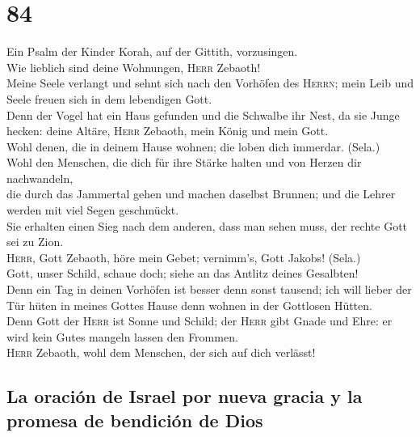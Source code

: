 \hypertarget{section-83}{%
\section{84}\label{section-83}}

 Ein Psalm der Kinder Korah, auf der Gittith,
vorzusingen.\\
 Wie lieblich sind deine Wohnungen, \textsc{Herr}
Zebaoth!\\
 Meine Seele verlangt und sehnt sich nach den Vorhöfen des
\textsc{Herrn}; mein Leib und Seele freuen sich in dem lebendigen
Gott.\\
 Denn der Vogel hat ein Haus gefunden und die Schwalbe ihr
Nest, da sie Junge hecken: deine Altäre, \textsc{Herr} Zebaoth, mein
König und mein Gott.\\
 Wohl denen, die in deinem Hause wohnen; die loben dich
immerdar. (Sela.)\\
 Wohl den Menschen, die dich für ihre Stärke halten und
von Herzen dir nachwandeln,\\
 die durch das Jammertal gehen und machen daselbst
Brunnen; und die Lehrer werden mit viel Segen geschmückt.\\
 Sie erhalten einen Sieg nach dem anderen, dass man sehen
muss, der rechte Gott sei zu Zion.\\
 \textsc{Herr}, Gott Zebaoth, höre mein Gebet; vernimm's,
Gott Jakobs! (Sela.)\\
 Gott, unser Schild, schaue doch; siehe an das Antlitz
deines Gesalbten!\\
 Denn ein Tag in deinen Vorhöfen ist besser denn sonst
tausend; ich will lieber der Tür hüten in meines Gottes Hause denn
wohnen in der Gottlosen Hütten.\\
 Denn Gott der \textsc{Herr} ist Sonne und Schild; der
\textsc{Herr} gibt Gnade und Ehre: er wird kein Gutes mangeln lassen den
Frommen.\\
 \textsc{Herr} Zebaoth, wohl dem Menschen, der sich auf
dich verlässt!

\hypertarget{la-oraciuxf3n-de-israel-por-nueva-gracia-y-la-promesa-de-bendiciuxf3n-de-dios}{%
\subsection{La oración de Israel por nueva gracia y la promesa de
bendición de
Dios}\label{la-oraciuxf3n-de-israel-por-nueva-gracia-y-la-promesa-de-bendiciuxf3n-de-dios}}

